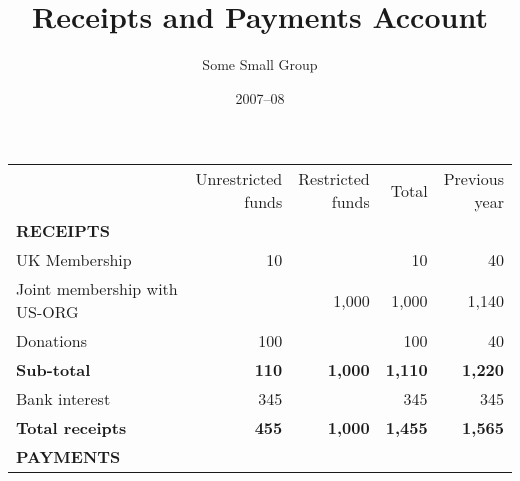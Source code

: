 \documentclass[12pt,a4paper]{article}
\author{Some Small Group}
\title{Receipts and Payments Account}
\date{2007--08} %
\begin{document}
\maketitle

\begin{tabular}{lr|r|r||r} %

 & \parbox[b]{5.5em}{\raggedleft Unrestricted \\ funds}
 & \parbox[b]{4.5em}{\raggedleft Restricted \\ funds}
 & \parbox[b]{2.5em}{\raggedleft Total}
 & \parbox[b]{4em}{\raggedleft Previous \\ year} \\
 
\textbf{RECEIPTS} \\[2ex] %
 
UK Membership                & 10  &       & 10    & 40    \\
Joint membership with US-ORG &     & 1,000 & 1,000 & 1,140 \\
Donations                    & 100 &       & 100   & 40    \\[1ex]

\textbf{Sub-total}           & \textbf{110} & \textbf{1,000} 
  & \textbf{1,110} & \textbf{1,220} \\[1ex]
  
Bank interest                & 345 &       & 345   & 345   \\[1ex]
  
\textbf{Total receipts}       & \textbf{455} & \textbf{1,000} 
  & \textbf{1,455} & \textbf{1,565} \\[1ex]
 
\textbf{PAYMENTS} \\[2ex]


\end{tabular}
\end{document}
